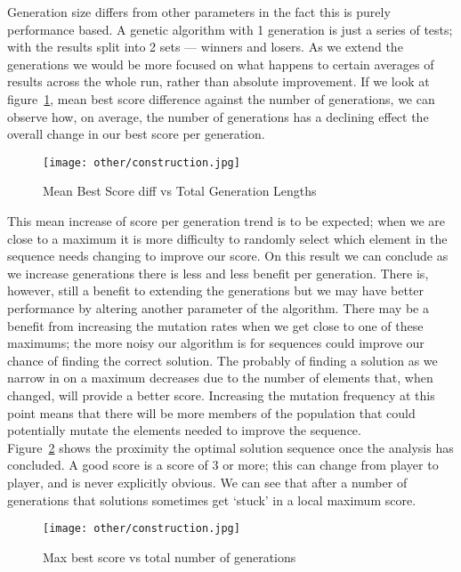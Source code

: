 Generation size differs from other parameters in the fact this is purely performance based.
A genetic algorithm with 1 generation is just a series of tests; with the results split into 2 sets --- winners and losers.
As we extend the generations we would be more focused on what happens to certain averages of results across the whole run, rather than absolute improvement.
If we look at figure~\ref{fig:GENS-mean-bs-diff-v-gens-all}, mean best score difference against the number of generations, we can observe how, on average, the number of generations has a declining effect the overall change in our best score per generation.\\ 

\begin{figure}
    \texttt{[image: other/construction.jpg]}
    \caption{Mean Best Score diff vs Total Generation Lengths}\label{fig:GENS-mean-bs-diff-v-gens-all}
\end{figure}

This mean increase of score per generation trend is to be expected; when we are close to a maximum it is more difficulty to randomly select which element in the sequence needs changing to improve our score.
On this result we can conclude as we increase generations there is less and less benefit per generation.
There is, however, still a benefit to extending the generations but we may have better performance by altering another parameter of the algorithm.
There may be a benefit from increasing the mutation rates when we get close to one of these maximums; the more noisy our algorithm is for sequences could improve our chance of finding the correct solution.
The probably of finding a solution as we narrow in on a maximum decreases due to the number of elements that, when changed, will provide a better score. 
Increasing the mutation frequency at this point means that there will be more members of the population that could potentially mutate the elements needed to improve the sequence.\\ 

Figure~\ref{fig:GENS-max-bs-v-gens-all} shows the proximity the optimal solution sequence once the analysis has concluded.
A good score is a score of 3 or more; this can change from player to player, and is never explicitly obvious.
We can see that after a number of generations that solutions sometimes get `stuck' in a local maximum score.

\begin{figure}
    \texttt{[image: other/construction.jpg]}
    \caption{Max best score vs total number of generations}\label{fig:GENS-max-bs-v-gens-all}
\end{figure}

